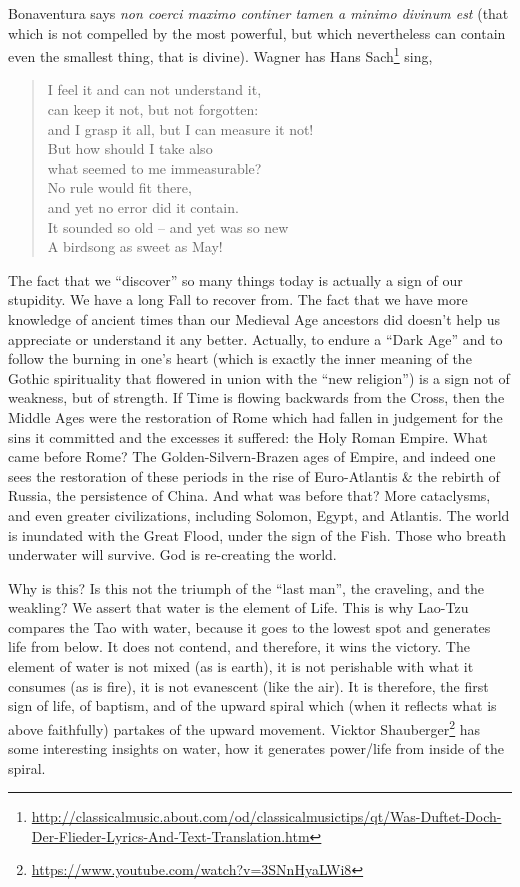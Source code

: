 Bonaventura says \emph{non coerci maximo continer tamen a minimo divinum est} (that which is not compelled by the most powerful, but which nevertheless can contain even the smallest thing, that is divine). Wagner has Hans Sach\footnote{\url{http://classicalmusic.about.com/od/classicalmusictips/qt/Was-Duftet-Doch-Der-Flieder-Lyrics-And-Text-Translation.htm}} sing,

\begin{quotex}
\begin{verse}
I feel it and can not understand it,\\
can keep it not, but not forgotten:\\
and I grasp it all, but I can measure it not!\\
But how should I take also\\
what seemed to me immeasurable?\\
No rule would fit there,\\
and yet no error did it contain.\\
It sounded so old -- and yet was so new\\
A birdsong as sweet as May!
\end{verse}
\end{quotex}


The fact that we ``discover'' so many things today is actually a sign of our stupidity. We have a long Fall to recover from. The fact that we have more knowledge of ancient times than our Medieval Age ancestors did doesn't help us appreciate or understand it any better. Actually, to endure a ``Dark Age'' and to follow the burning in one's heart (which is exactly the inner meaning of the Gothic spirituality that flowered in union with the ``new religion'') is a sign not of weakness, but of strength. If Time is flowing backwards from the Cross, then the Middle Ages were the restoration of Rome which had fallen in judgement for the sins it committed and the excesses it suffered: the Holy Roman Empire. What came before Rome? The Golden-Silvern-Brazen ages of Empire, and indeed one sees the restoration of these periods in the rise of Euro-Atlantis \& the rebirth of Russia, the persistence of China. And what was before that? More cataclysms, and even greater civilizations, including Solomon, Egypt, and Atlantis. The world is inundated with the Great Flood, under the sign of the Fish. Those who breath underwater will survive. God is re-creating the world.

Why is this? Is this not the triumph of the ``last man'', the craveling, and the weakling? We assert that water is the element of Life. This is why Lao-Tzu compares the Tao with water, because it goes to the lowest spot and generates life from below. It does not contend, and therefore, it wins the victory. The element of water is not mixed (as is earth), it is not perishable with what it consumes (as is fire), it is not evanescent (like the air). It is therefore, the first sign of life, of baptism, and of the upward spiral which (when it reflects what is above faithfully) partakes of the upward movement. Vicktor Shauberger\footnote{\url{https://www.youtube.com/watch?v=3SNnHyaLWi8}} has some interesting insights on water, how it generates power/life from inside of the spiral.

